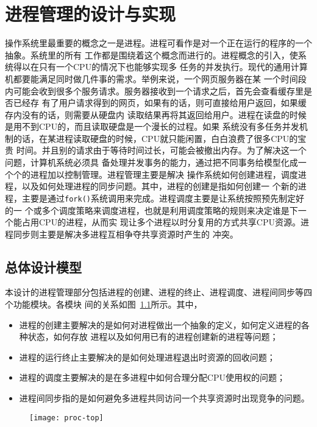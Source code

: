 \documentclass{swfcthesismscctex}
\begin{document}
\chapter{进程管理的设计与实现}

操作系统里最重要的概念之一是进程。进程可看作是对一个正在运行的程序的一个抽象。系统里的所有
工作都是围绕着这个概念而进行的。进程概念的引入，使系统得以在只有一个CPU的情况下也能够实现多
任务的并发执行。现代的通用计算机都要能满足同时做几件事的需求。举例来说，一个网页服务器在某
一个时间段内可能会收到很多个服务请求。服务器接收到一个请求之后，首先会查看缓存里是否已经存
有了用户请求得到的网页，如果有的话，则可直接给用户返回，如果缓存内没有的话，则需要从硬盘内
读取结果再将其返回给用户。进程在读盘的时候是用不到CPU的，而且读取硬盘是一个漫长的过程。如果
系统没有多任务并发机制的话，在某进程读取硬盘的时候，CPU就只能闲置，白白浪费了很多CPU的宝贵
时间。并且别的请求由于等待时间过长，可能会被撤出内存。为了解决这一个问题，计算机系统必须具
备处理并发事务的能力，通过把不同事务给模型化成一个个的进程加以控制管理。进程管理主要是解决
操作系统如何创建进程，调度进程，以及如何处理进程的同步问题。其中，进程的创建是指如何创建一
个新的进程，主要是通过\texttt{fork()}系统调用来完成。进程调度主要是让系统按照预先制定好的一
个或多个调度策略来调度进程，也就是利用调度策略的规则来决定谁是下一个能占用CPU的进程，从而实
现让多个进程以时分复用的方式共享CPU资源。进程同步则主要是解决多进程互相争夺共享资源时产生的
冲突。

\section{总体设计模型}

本设计的进程管理部分包括进程的创建、进程的终止、进程调度、进程间同步等四个功能模块。各模块
间的关系如图~\ref{fig:proc-top}所示。其中，
\begin{itemize}
\item 进程的创建主要解决的是如何对进程做出一个抽象的定义，如何定义进程的各种状态，如何存放
  进程以及如何用已有的进程创建新的进程等问题；
\item 进程的运行终止主要解决的是如何处理进程退出时资源的回收问题；
\item 进程的调度主要解决的是在多进程中如何合理分配CPU使用权的问题；
\item 进程间同步指的是如何避免多进程共同访问一个共享资源时出现竞争的问题。
\end{itemize}

\begin{figure}[h]
  \centering
  \begin{center}
    \texttt{[image: proc-top]}
  \end{center}
  \label{fig:proc-top}
\end{figure}
\end{document}
